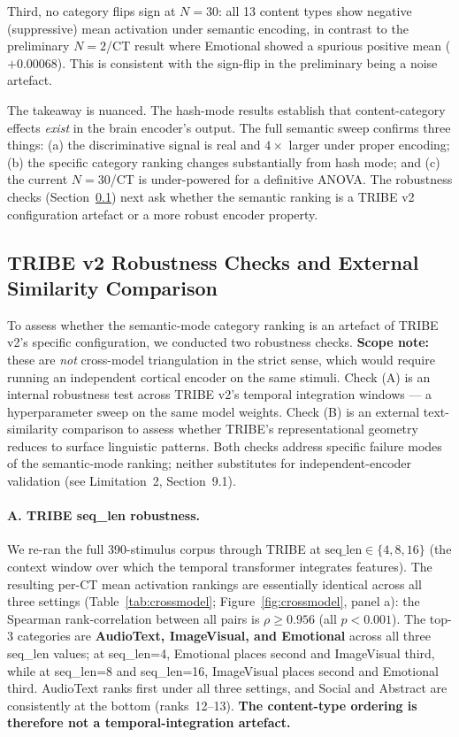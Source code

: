 \documentclass[11pt,letterpaper]{article}
\begin{document}
Third, no category flips sign at $N=30$: all 13 content types show negative (suppressive) mean activation under semantic encoding, in contrast to the preliminary $N=2$/CT result where Emotional showed a spurious positive mean ($+0.00068$). This is consistent with the sign-flip in the preliminary being a noise artefact.

The takeaway is nuanced. The hash-mode results establish that content-category effects \textit{exist} in the brain encoder's output. The full semantic sweep confirms three things: (a) the discriminative signal is real and $4\times$ larger under proper encoding; (b) the specific category ranking changes substantially from hash mode; and (c) the current $N=30$/CT is under-powered for a definitive ANOVA. The robustness checks (Section~\ref{sec:crossmodel}) next ask whether the semantic ranking is a TRIBE v2 configuration artefact or a more robust encoder property.

\subsection{TRIBE v2 Robustness Checks and External Similarity Comparison}\label{sec:crossmodel}

To assess whether the semantic-mode category ranking is an artefact of TRIBE v2's specific configuration, we conducted two robustness checks. \textbf{Scope note:} these are \emph{not} cross-model triangulation in the strict sense, which would require running an independent cortical encoder on the same stimuli. Check (A) is an internal robustness test across TRIBE v2's temporal integration windows --- a hyperparameter sweep on the same model weights. Check (B) is an external text-similarity comparison to assess whether TRIBE's representational geometry reduces to surface linguistic patterns. Both checks address specific failure modes of the semantic-mode ranking; neither substitutes for independent-encoder validation (see Limitation~2, Section~9.1).

\paragraph{A. TRIBE seq\_len robustness.}
We re-ran the full 390-stimulus corpus through TRIBE at $\text{seq\_len} \in \{4, 8, 16\}$ (the context window over which the temporal transformer integrates features). The resulting per-CT mean activation rankings are essentially identical across all three settings (Table~\ref{tab:crossmodel}; Figure~\ref{fig:crossmodel}, panel a): the Spearman rank-correlation between all pairs is $\rho \geq 0.956$ (all $p < 0.001$). The top-3 categories are \textbf{AudioText, ImageVisual, and Emotional} across all three seq\_len values; at seq\_len=4, Emotional places second and ImageVisual third, while at seq\_len=8 and seq\_len=16, ImageVisual places second and Emotional third. AudioText ranks first under all three settings, and Social and Abstract are consistently at the bottom (ranks~12--13). \textbf{The content-type ordering is therefore not a temporal-integration artefact.}
\end{document}
